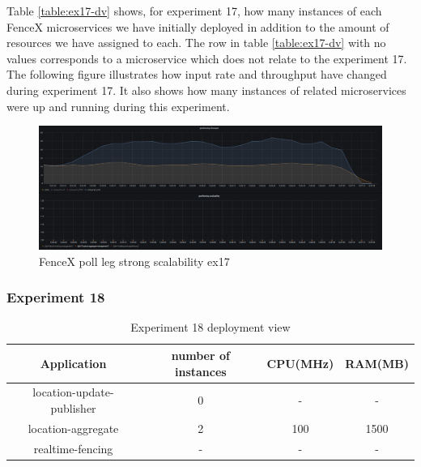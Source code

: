 \documentclass[a4]{report}
\begin{document}
    Table \ref{table:ex17-dv} shows, for experiment 17, how many instances of each FenceX microservices we have
    initially deployed in addition to the amount of resources we have assigned to each.
    The row in table \ref{table:ex17-dv} with no values corresponds to a microservice which does not relate to the
    experiment 17.
    The following figure illustrates how input rate and throughput have changed during experiment 17.
    It also shows how many instances of related microservices were up and running during this experiment.

    \begin{figure}[h!]
        \centering
        \caption{FenceX poll leg strong scalability ex17}
        \label{fig:ex17}
        \includegraphics[width=\linewidth, scale=2]{images/evaluation/ex17-benchmarking-ongoing-2per4sec.png}
    \end{figure}

    \clearpage

    \subsubsection{Experiment 18}
    \begin{table}[h!]
        \centering
        \begin{tabular}{|c|c|c|c|}
            \hline
            Application               & number of instances & CPU(MHz) & RAM(MB) \\
            \hline
            location-update-publisher & 0                   & -        & -       \\
            location-aggregate        & 2                   & 100      & 1500    \\
            realtime-fencing          & -                   & -        & -       \\
            \hline
        \end{tabular}
        \caption{Experiment 18 deployment view}
        \label{table:ex18-dv}
    \end{table}
\end{document}
